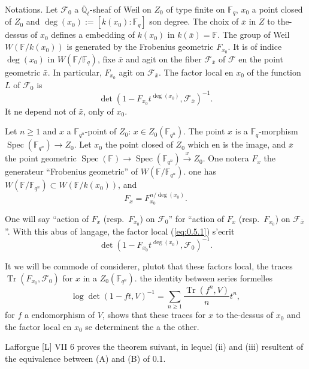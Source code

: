 \documentclass[11pt,a4paper]{article}
\theoremstyle{plain}
\theoremstyle{definition}
\DeclareMathOperator{\Spec}{Spec}
\DeclareMathOperator{\tr}{Tr}
\begin{document}
Notations. Let $\mathcal{F}_0$ a $\overline{\mathbb{Q}}_\ell$-sheaf of Weil on $Z_0$ of type finite on $\mathbb{F}_q$, $x_0$ a point closed of $Z_0$ and $\deg(x_0) := [k(x_0):\mathbb{F}_q]$ son degree. The choix of $\bar{x}$ in $Z$ to the-dessus of $x_0$ defines a embedding of $k(x_0)$ in $k(\bar{x}) = \mathbb{F}$. The group of Weil $W(\mathbb{F}/k(x_0))$ is generated by the Frobenius geometric $F_{x_0}$. It is of indice $\deg(x_0)$ in $W(\mathbb{F}/\mathbb{F}_q)$, fixe $\bar{x}$ and agit on the fiber $\mathcal{F}_{\bar{x}}$ of $\mathcal{F}$ en the point geometric $\bar{x}$. In particular, $F_{x_0}$ agit on $\mathcal{F}_{\bar{x}}$. The factor local en $x_0$ of the function $L$ of $\mathcal{F}_0$ is
\begin{equation}\label{eq:0.5.1}
\det(1 - F_{x_0}t^{\deg(x_0)}, \mathcal{F}_{\bar{x}})^{-1}.
\end{equation}
It ne depend not of $\bar{x}$, only of $x_0$.

Let $n \geq 1$ and $x$ a $\mathbb{F}_{q^n}$-point of $Z_0$: $x \in Z_0(\mathbb{F}_{q^n})$. The point $x$ is a $\mathbb{F}_q$-morphism $\Spec(\mathbb{F}_{q^n}) \to Z_0$. Let $x_0$ the point closed of $Z_0$ which en is the image, and $\bar{x}$ the point geometric $\Spec(\mathbb{F}) \to \Spec(\mathbb{F}_{q^n}) \xrightarrow{x} Z_0$. One notera $F_x$ the generateur ``Frobenius geometric'' of $W(\mathbb{F}/\mathbb{F}_{q^n})$. one has $W(\mathbb{F}/\mathbb{F}_{q^n}) \subset W(\mathbb{F}/k(x_0))$, and
\begin{equation}\label{eq:0.5.2}
F_x = F_{x_0}^{n/\deg(x_0)}.
\end{equation}

One will say ``action of $F_x$ (resp.~$F_{x_0}$) on $\mathcal{F}_0$'' for ``action of $F_x$ (resp.~$F_{x_0}$) on $\mathcal{F}_{\bar{x}}$''. With this abus of langage, the factor local (\ref{eq:0.5.1}) s'ecrit
\[
\det(1 - F_{x_0}t^{\deg(x_0)}, \mathcal{F}_0)^{-1}.
\]

It we will be commode of considerer, plutot that these factors local, the traces $\tr(F_{x_0},\mathcal{F}_0)$ for $x$ in a $Z_0(\mathbb{F}_{q^n})$. the identity between series formelles
\[
\log \det(1 - ft, V)^{-1} = \sum_{n \geq 1} \frac{\tr(f^n,V)}{n} t^n,
\]
for $f$ a endomorphism of $V$, shows that these traces for $x$ to the-dessus of $x_0$ and the factor local en $x_0$ se determinent the a the other.

Lafforgue [L] VII 6 proves the theorem suivant, in lequel (ii) and (iii) resultent of the equivalence between (A) and (B) of 0.1.
\end{document}
